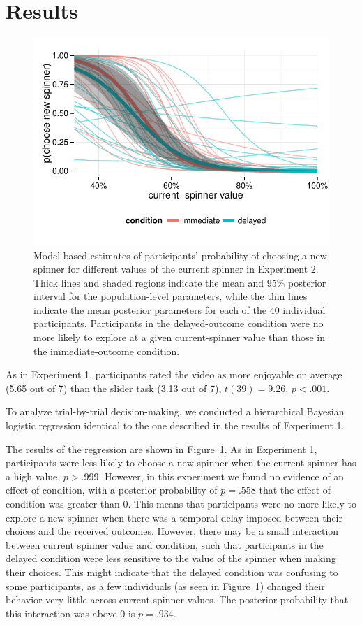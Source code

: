 \documentclass[10pt,letterpaper]{article}
\begin{document}
\section{Results}

\begin{figure}
\centering
\includegraphics[width=\columnwidth]{figures/exp2results.pdf}
\caption{Model-based estimates of participants' probability of choosing a new
  spinner for different values of the current spinner in Experiment 2. Thick
  lines and shaded regions indicate the mean and 95\% posterior interval for the
  population-level parameters, while the thin lines indicate the mean posterior
  parameters for each of the 40 individual participants. Participants in the
  delayed-outcome condition were no more
  likely to explore at a given current-spinner value than those in the
  immediate-outcome condition.}
\label{fig:exp2results}
\end{figure}

As in Experiment 1, participants rated the video as more enjoyable on average (5.65 out of 7) than the
slider task (3.13 out of 7), $t(39)=9.26$, $p<.001$.

To analyze trial-by-trial decision-making, we conducted a hierarchical Bayesian
logistic regression identical to the one described in the results of Experiment 1.

The results of the regression are shown in Figure~\ref{fig:exp2results}. As in Experiment 1,
participants were less likely to choose a new spinner when the current spinner
has a high value, $p>.999$. However, in this experiment we found no evidence of
an effect of condition, with a posterior probability of $p=.558$ that the effect of condition was
greater than 0. This means that participants were no more likely to explore a new spinner when there
was a temporal delay imposed between their choices and the received outcomes.
However, there may be a small interaction between current spinner value and
condition, such that participants in the delayed condition were less sensitive
to the value of the spinner when making their choices. This might indicate that
the delayed condition was confusing to some participants, as a few individuals
(as seen in Figure~\ref{fig:exp2results}) changed their behavior very little
across current-spinner values. The posterior probability that this interaction
was above 0 is $p=.934$.
\end{document}
